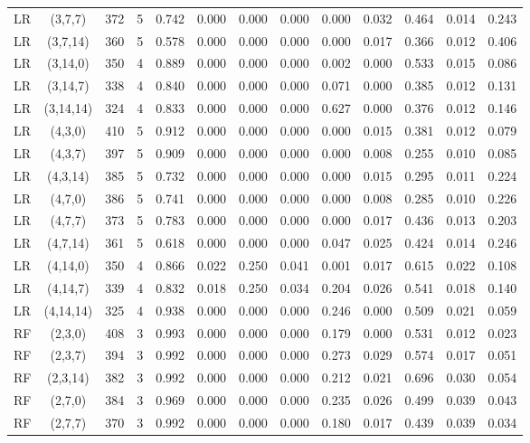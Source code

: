 \begin{longtable}{lcccccccccccc}
LR & (3,7,7) & 372 & 5 & 0.742 & 0.000 & 0.000 & 0.000 & 0.000 & 0.032 & 0.464 & 0.014 & 0.243 \\
LR & (3,7,14) & 360 & 5 & 0.578 & 0.000 & 0.000 & 0.000 & 0.000 & 0.017 & 0.366 & 0.012 & 0.406 \\
LR & (3,14,0) & 350 & 4 & 0.889 & 0.000 & 0.000 & 0.000 & 0.002 & 0.000 & 0.533 & 0.015 & 0.086 \\
LR & (3,14,7) & 338 & 4 & 0.840 & 0.000 & 0.000 & 0.000 & 0.071 & 0.000 & 0.385 & 0.012 & 0.131 \\
LR & (3,14,14) & 324 & 4 & 0.833 & 0.000 & 0.000 & 0.000 & 0.627 & 0.000 & 0.376 & 0.012 & 0.146 \\
LR & (4,3,0) & 410 & 5 & 0.912 & 0.000 & 0.000 & 0.000 & 0.000 & 0.015 & 0.381 & 0.012 & 0.079 \\
LR & (4,3,7) & 397 & 5 & 0.909 & 0.000 & 0.000 & 0.000 & 0.000 & 0.008 & 0.255 & 0.010 & 0.085 \\
LR & (4,3,14) & 385 & 5 & 0.732 & 0.000 & 0.000 & 0.000 & 0.000 & 0.015 & 0.295 & 0.011 & 0.224 \\
LR & (4,7,0) & 386 & 5 & 0.741 & 0.000 & 0.000 & 0.000 & 0.000 & 0.008 & 0.285 & 0.010 & 0.226 \\
LR & (4,7,7) & 373 & 5 & 0.783 & 0.000 & 0.000 & 0.000 & 0.000 & 0.017 & 0.436 & 0.013 & 0.203 \\
LR & (4,7,14) & 361 & 5 & 0.618 & 0.000 & 0.000 & 0.000 & 0.047 & 0.025 & 0.424 & 0.014 & 0.246 \\
LR & (4,14,0) & 350 & 4 & 0.866 & 0.022 & 0.250 & 0.041 & 0.001 & 0.017 & 0.615 & 0.022 & 0.108 \\
LR & (4,14,7) & 339 & 4 & 0.832 & 0.018 & 0.250 & 0.034 & 0.204 & 0.026 & 0.541 & 0.018 & 0.140 \\
LR & (4,14,14) & 325 & 4 & 0.938 & 0.000 & 0.000 & 0.000 & 0.246 & 0.000 & 0.509 & 0.021 & 0.059 \\
RF & (2,3,0) & 408 & 3 & 0.993 & 0.000 & 0.000 & 0.000 & 0.179 & 0.000 & 0.531 & 0.012 & 0.023 \\
RF & (2,3,7) & 394 & 3 & 0.992 & 0.000 & 0.000 & 0.000 & 0.273 & 0.029 & 0.574 & 0.017 & 0.051 \\
RF & (2,3,14) & 382 & 3 & 0.992 & 0.000 & 0.000 & 0.000 & 0.212 & 0.021 & 0.696 & 0.030 & 0.054 \\
RF & (2,7,0) & 384 & 3 & 0.969 & 0.000 & 0.000 & 0.000 & 0.235 & 0.026 & 0.499 & 0.039 & 0.043 \\
RF & (2,7,7) & 370 & 3 & 0.992 & 0.000 & 0.000 & 0.000 & 0.180 & 0.017 & 0.439 & 0.039 & 0.034 \\

\end{longtable}
